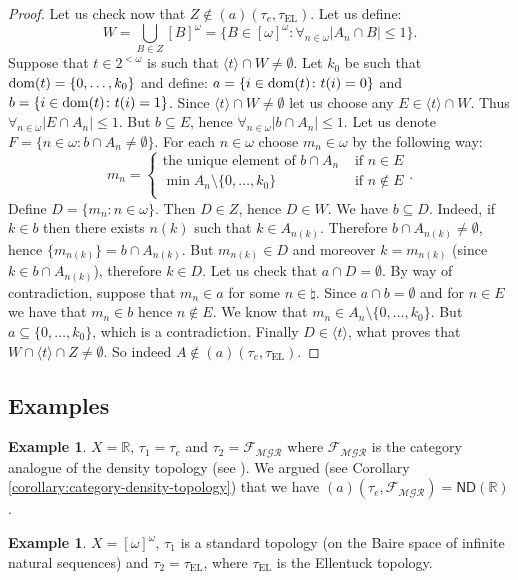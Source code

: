 \documentclass[12pt]{amsart}
\theoremstyle{plain}
\theoremstyle{definition}
\newtheorem{example}[theorem]{Example}
\theoremstyle{remark}
\newcommand{\dom}{{\rm dom}}
\newcommand{\infsub}{[\omega]^{\omega}}
\newcommand{\meager}{{\mathcal{MGR}}}
\newcommand{\real}{\mathbb{R}}
\newcommand{\cF}{{\mathcal F}}
\newcommand{\aideal}{\mathit{(a)}}
\newcommand{\tauEllentuck}{\tau_{\mathrm{EL}}}
\newcommand{\ninomega}{n\in\omega}
\begin{document}
\begin{proof}
Let us check now that 
$Z \not\in \aideal(\tau_e, \tauEllentuck)$.
Let us define:
\[
W = \bigcup_{B \in Z} [B]^\omega = \lbrace B\in\infsub\colon \forall_{\ninomega} 
|A_n \cap B| \leq 1\rbrace.
\]
Suppose that $t\in 2^{<\omega}$ is such that
$\langle t \rangle \cap W \not= \emptyset$.
Let $k_0$ be such that $\dom(t) = \lbrace 0, \ldots, k_0\rbrace$ and 
define: $a = \lbrace i \in \dom(t) \colon t(i) = 0 \rbrace$ 
and 
$b = \lbrace i \in \dom(t) \colon t(i) = 1 \rbrace$. Since 
$\langle t \rangle \cap W \not= \emptyset$ let us choose
any $E \in \langle t \rangle \cap W$. Thus 
$\forall_{\ninomega} |E \cap A_n| \leq 1$. But $b \subseteq E$,
hence $\forall_{\ninomega} |b \cap A_n| \leq 1$.
Let us denote $F = \lbrace \ninomega\colon b\cap A_n \not= \emptyset\rbrace$.
For each $n\in \omega$ choose $m_n\in\omega$ by the following way:
\[m_n = \begin{cases}
  \text{the unique element of } b \cap A_n   & \text{ if }
  n\in E\\
  \min A_n \setminus \lbrace 0, \ldots, k_0\rbrace & \text{ if }
  n\not\in E \\
\end{cases}.\]
Define $D = \lbrace m_n \colon n \in \omega\rbrace$.
Then $D \in Z$, hence $D \in W$.
We have $b\subseteq D$. Indeed, if $k\in b$ then
there exists $n(k)$ such that $k \in A_{n(k)}$.
Therefore $b \cap A_{n(k)} \not= \emptyset$, hence
$\lbrace m_{n(k)} \rbrace = b \cap A_{n(k)}$.
But $m_{n(k)} \in D$ and moreover $k = m_{n(k)}$
(since $k\in b \cap A_{n(k)}$), therefore
$k\in D$.
Let us check that $a \cap D = \emptyset$.
By way of contradiction, suppose that $m_n \in a$
for some $n\in\natural$. Since $a\cap b = \emptyset$
and for $n\in E$ we have that $m_n \in b$
hence $n \not\in E$. We know that 
$m_n \in A_n \setminus \lbrace 0, \ldots, k_0\rbrace$.
But $a \subseteq \lbrace 0, \ldots, k_0\rbrace$,
which is a contradiction.
Finally $D\in \langle t \rangle$, what
proves that $W \cap \langle t \rangle \cap Z \not= \emptyset$.
So indeed $A \not\in \aideal (\tau_e, \tauEllentuck)$.
\end{proof}


\subsection{Examples}
\begin{example}
$X = \real$,
$\tau_1 = \tau_e$ and
$\tau_2 = \cF_{\meager}$
where $\cF_{\meager}$ is the category analogue of the density topology (see \cite{PWBW}).
We argued (see Corollary \ref{corollary:category-density-topology}) that we have 
$(a)(\tau_e, \cF_{\meager}) = \mathsf{ND}(\real)$.
\end{example}
\begin{example}
\label{example:ellentuck}
$X = [\omega]^\omega$,
$\tau_1$ is a standard topology (on the Baire space of infinite natural sequences) and
$\tau_2 = \tauEllentuck$, where $\tauEllentuck$ is the Ellentuck topology.
\end{example}
\end{document}
